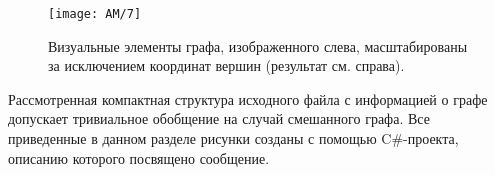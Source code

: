 \begin{figure}[H]\label{akm5.4_pic}
	\centering
	\texttt{[image: AM/7]}
	\caption{Визуальные элементы графа, изображенного слева, масштабированы за исключением координат вершин (результат см. справа).}
\end{figure}
Рассмотренная компактная структура исходного файла с информацией о графе
	допускает тривиальное обобщение на случай смешанного графа. Все приведенные в данном разделе рисунки созданы с помощью
C\#-проекта, описанию которого посвящено сообщение.

%









